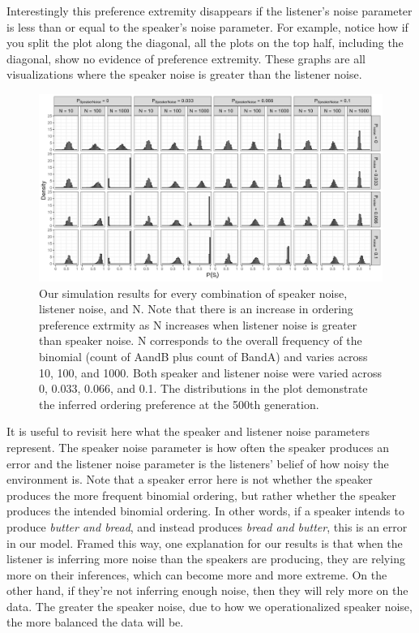 \documentclass[10pt, letterpaper, hidelinks]{article}
\newenvironment{CodeChunk}{}{}
\begin{document}
Interestingly this preference extremity disappears if the listener's
noise parameter is less than or equal to the speaker's noise parameter.
For example, notice how if you split the plot along the diagonal, all
the plots on the top half, including the diagonal, show no evidence of
preference extremity. These graphs are all visualizations where the
speaker noise is greater than the listener noise.

\begin{CodeChunk}
\begin{figure}[!htb]
\includegraphics[width=1\linewidth]{Figures/full_plot_smallerN} \caption[Our simulation results for every combination of speaker noise, listener noise, and N]{Our simulation results for every combination of speaker noise, listener noise, and N. Note that there is an increase in ordering preference extrmity as N increases when listener noise is greater than speaker noise. N corresponds to the overall frequency of the binomial (count of AandB plus count of BandA) and varies across 10, 100, and 1000. Both speaker and listener noise were varied across 0, 0.033, 0.066, and 0.1. The distributions in the plot demonstrate the inferred ordering preference at the 500th generation.}\label{fig:fullsimsplot}
\end{figure}
\end{CodeChunk}

It is useful to revisit here what the speaker and listener noise
parameters represent. The speaker noise parameter is how often the
speaker produces an error and the listener noise parameter is the
listeners' belief of how noisy the environment is. Note that a speaker
error here is not whether the speaker produces the more frequent
binomial ordering, but rather whether the speaker produces the intended
binomial ordering. In other words, if a speaker intends to produce
\emph{butter and bread}, and instead produces \emph{bread and butter},
this is an error in our model. Framed this way, one explanation for our
results is that when the listener is inferring more noise than the
speakers are producing, they are relying more on their inferences, which
can become more and more extreme. On the other hand, if they're not
inferring enough noise, then they will rely more on the data. The
greater the speaker noise, due to how we operationalized speaker noise,
the more balanced the data will be.
\end{document}
